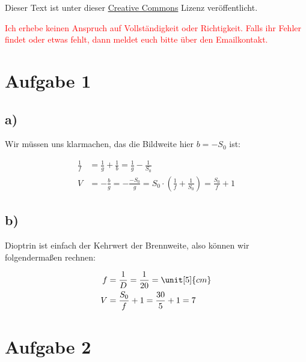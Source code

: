 




\maketitle

Dieser Text ist unter dieser \href{http://creativecommons.org/licenses/by-nc-sa/4.0/}{Creative Commons} Lizenz veröffentlicht.

\textcolor{red}{Ich erhebe keinen Anspruch auf Vollständigkeit oder Richtigkeit. Falls ihr Fehler findet oder etwas fehlt, dann meldet euch bitte über den Emailkontakt.}

\tableofcontents


\newpage



\section{Aufgabe 1}


\subsection*{a)}

Wir müssen uns klarmachen, das die Bildweite hier $b = -S_0$ ist:

\begin{align*}
\frac{1}{f} &= \frac{1}{g} + \frac{1}{b} = \frac{1}{g} - \frac{1}{S_0} \\
V &= - \frac{b}{g} = - \frac{-S_0}{g} = S_0 \cdot \left( \frac{1}{f} + \frac{1}{S_0} \right) = \frac{S_0}{f} + 1
\end{align*}


\subsection*{b)}

Dioptrin ist einfach der Kehrwert der Brennweite, also können wir folgendermaßen rechnen:

\begin{align*}
f &= \frac{1}{D} = \frac{1}{20} = \unit[5]{cm} \\
V &= \frac{S_0}{f} + 1 = \frac{30}{5} + 1 = 7
\end{align*}


\section{Aufgabe 2}


